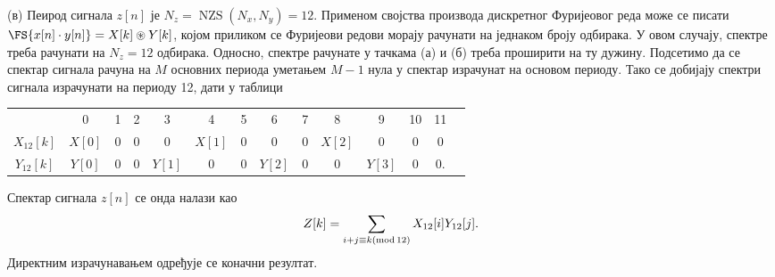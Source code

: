 (в) Пеирод сигнала $z[n]$ је $N_{z} = \operatorname{NZS}(N_x, N_y) = 12$. Применом својства производа дискретног Фуријеовог реда 
може се писати $ \FS{x[n]\cdot y[n]} = X[k] \circledast Y[k]$, којом приликом се Фуријеови редови морају рачунати на једнаком броју 
одбирака. У овом случају, спектре треба рачунати на $N_z = 12$ одбирака. Односно, спектре рачунате у тачкама (а) и (б) треба проширити на ту дужину. 
Подсетимо да се спектар сигнала рачуна на $M$ основних периода уметањем $M-1$ нула у спектар израчунат на основом периоду. Тако се добијају 
спектри сигнала израчунати на периоду 12, дати у таблици \\
\begin{tabular}{c|ccccccccccccc}
            & 0 & 1 & 2 & 3 & 4 & 5 & 6 & 7 & 8 & 9 & 10 & 11 \\
    $X_{12}[k]$ & $X[0]$ & 0 & 0 & 0 & $X[1]$ & 0 & 0 & 0 & $X[2]$ & 0 & 0 & 0 \\
    $Y_{12}[k]$ & $Y[0]$ & 0 & 0 & $Y[1]$ & 0 & 0 & $Y[2]$ & 0 & 0 & $Y[3]$ & 0 & 0.  \\
\end{tabular} 

\noindent
Спектар сигнала $z[n]$ се онда налази као 
\begin{equation}
    Z[k] = \sum_{i + j \equiv k ({\rm mod}\, 12)} X_{12}[i] Y_{12}[j].
\end{equation}
Директним израчунавањем одређује се коначни резултат.